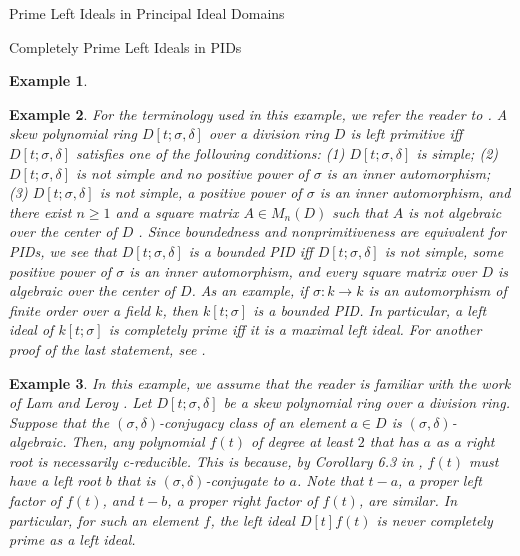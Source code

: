 \documentclass[11pt,a4paper]{article}
\theoremstyle{theorem}
\newtheorem{example}{Example}[section]
\numberwithin{equation}{section}
\newcommand{\s}{\sigma}
\begin{document}
\begin{section}{Prime Left Ideals in Principal Ideal Domains}
\begin{subsection}{Completely Prime Left Ideals in PIDs }
\begin{example}
		\end{example}  
		\begin{example}
			For the terminology used in this example, we refer the reader to \cite{leroy1995pseudo}. A skew polynomial ring \(D[t;\sigma,\delta]\) over a division ring \(D\) is left primitive iff \(D[t;\sigma,\delta]\) satisfies one of the following conditions: (1) \(D[t;\sigma,\delta]\) is simple; (2)  \(D[t;\sigma,\delta]\) is not simple and no positive power of \(\sigma\) is an inner automorphism; (3)  \(D[t;\sigma,\delta]\) is not simple, a positive power of \(\sigma\) is an inner automorphism, and there exist \(n\geq 1\) and a square matrix \(A\in M_n(D)\) such that \(A\) is not algebraic over the center of \(D\) \cite[Theorem 3.26]{leroy1995pseudo}. Since boundedness and nonprimitiveness are equivalent for PIDs, we see that \(D[t;\sigma,\delta]\) is a bounded PID iff \(D[t;\sigma,\delta]\) is not simple, some positive power of \(\sigma\) is an inner automorphism, and every square matrix over \(D\) is algebraic over the center of \(D\). As an example, if \(\sigma:k\to k\) is an automorphism of finite order over a field \(k\), then \(k[t;\sigma]\) is a bounded PID. In particular,  a left ideal of \(k[t;\sigma]\) is completely prime iff it is a maximal left ideal. For another proof of the last statement, see \cite[Theorem 1.1]{alon2022completely}. 
		\end{example} 
		\begin{example}
			In this example, we assume that the reader is familiar with the work of  Lam and Leroy \cite{lam2004wedderburn}. Let \( D[t;\s,\delta] \) be a skew polynomial ring over a division ring. Suppose that the \((\sigma,\delta)\)-conjugacy class of an element \(a\in D\) is \((\sigma,\delta)\)-algebraic. Then, any polynomial \(f(t)\) of degree at least \(2\) that has \(a\) as a right root is necessarily c-reducible.  This is because, by Corollary 6.3 in \cite{lam2004wedderburn}, \(f(t)\) must have a left root \(b\) that is \((\sigma,\delta)\)-conjugate  to \(a\). Note that \(t-a\), a proper left factor of \(f(t)\), and \(t-b\),  a proper right factor of \(f(t)\), are similar. In particular, for such an element \(f\), the left ideal \(D[t]f(t)\) is never completely prime as a left ideal. 
		\end{example} 
		

\end{subsection}
\end{section}
\end{document}
